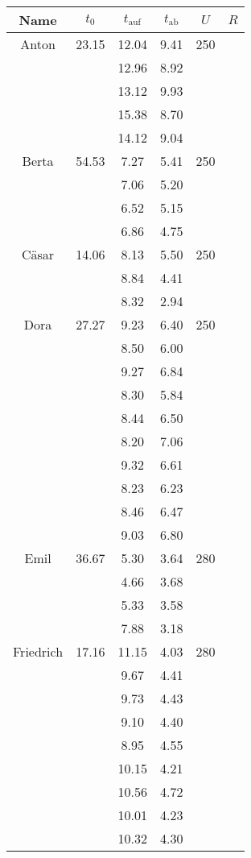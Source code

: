 \begin{table}
\begin{tabular}{cccccc}
	Name & $t_0$ & $t_\text{auf}$ & $t_\text{ab}$ & $U$ & $R$ \\
	\hline
	Anton & 23.15 & 12.04 & 9.41 & 250 & \\
	& & 12.96 & 8.92 & & \\
	& & 13.12 & 9.93 & & \\
	& & 15.38 & 8.70 & & \\
	& & 14.12 & 9.04 & & \\
	\hline
	Berta & 54.53 & 7.27 & 5.41 & 250 & \\
	& & 7.06 & 5.20 & & \\
	& & 6.52 & 5.15 & & \\
	& & 6.86 & 4.75 & & \\
	\hline
	Cäsar & 14.06 & 8.13 & 5.50 & 250 & \\
	& & 8.84 & 4.41 & & \\
	& & 8.32 & 2.94 & & \\
	\hline
	Dora & 27.27 & 9.23 & 6.40 & 250 & \\
	& & 8.50 & 6.00 & & \\
	& & 9.27 & 6.84 & & \\
	& & 8.30 & 5.84 & & \\
	& & 8.44 & 6.50 & & \\
	& & 8.20 & 7.06 & & \\
	& & 9.32 & 6.61 & & \\
	& & 8.23 & 6.23 & & \\
	& & 8.46 & 6.47 & & \\
	& & 9.03 & 6.80 & & \\
	\hline
	Emil & 36.67 & 5.30 & 3.64 & 280 & \\
	& & 4.66 & 3.68 & & \\
	& & 5.33 & 3.58 & & \\
	& & 7.88 & 3.18 & & \\
	\hline
	Friedrich & 17.16 & 11.15 & 4.03 & 280 & \\
	& & 9.67  & 4.41 & & \\
	& & 9.73  & 4.43 & & \\
	& & 9.10  & 4.40 & & \\
	& & 8.95  & 4.55 & & \\
	& & 10.15 & 4.21 & & \\
	& & 10.56 & 4.72 & & \\
	& & 10.01 & 4.23 & & \\
	& & 10.32 & 4.30 & & \\

\end{tabular}
\end{table}
